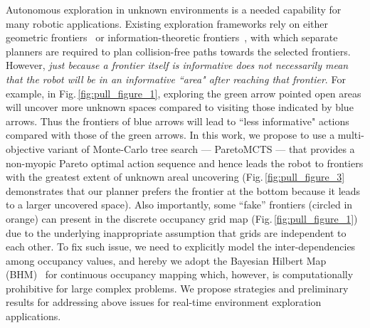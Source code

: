 Autonomous exploration in unknown environments is a needed capability for many robotic applications.
Existing exploration frameworks  rely on either geometric frontiers~\cite{yamauchi1997frontier,burgard2000collaborative,shen2012stochastic,cieslewski2017rapid} or  information-theoretic frontiers~\cite{charrow2015information,zhang2019fsmi,francis_functional_2020,francis_occupancy_2019,bai_information-theoretic_2016,jadidi_mutual_2015}, with which separate planners are required to plan collision-free paths towards the selected frontiers.
However, \textit{just because a frontier itself is informative does not necessarily mean that the robot will be in an informative ``area" after reaching that frontier}.
For example, in Fig.\,\ref{fig:pull_figure_1}, exploring the green arrow pointed open areas will uncover more unknown spaces compared to visiting those indicated by blue arrows.
Thus the frontiers of blue arrows will lead to ``less informative" actions compared with those of the green arrows.
In this work, we propose to use a multi-objective variant of Monte-Carlo tree search --- ParetoMCTS --- that provides a non-myopic Pareto optimal action sequence and hence leads the robot to frontiers with the greatest extent of unknown areal uncovering (Fig.\,\ref{fig:pull_figure_3} demonstrates that our planner prefers the frontier at the bottom because it leads to a larger uncovered space).
%
Also importantly, some ``fake'' frontiers (circled in orange) can present in the discrete occupancy grid map (Fig.\,\ref{fig:pull_figure_1}) due to the underlying inappropriate assumption that grids are independent to each other.
To fix such issue, we need to explicitly model the inter-dependencies among occupancy values, and hereby we adopt the Bayesian Hilbert Map (BHM)~\cite{senanayake2017bayesian} for continuous occupancy mapping which, however, is computationally prohibitive for large complex problems. 
We propose strategies and preliminary results for addressing above issues for real-time environment exploration applications. %


